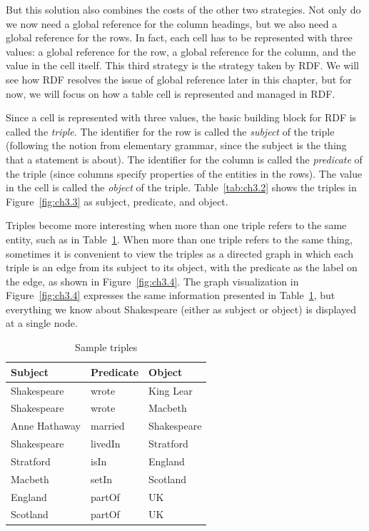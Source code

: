 But this solution also combines the costs of the other two strategies.
Not only do we now need a global reference for the column headings, but
we also need a global reference for the rows. In fact, each cell has to
be represented with three values: a global reference for the row, a
global reference for the column, and the value in the cell itself. This
third strategy is the strategy taken by RDF. We will see how RDF
resolves the issue of global reference later in this chapter, but for
now, we will focus on how a table cell is represented and managed in
RDF.

Since a cell is represented with three values, the basic building block
for RDF is called the \emph{triple}. The identifier for the row is called the
\emph{subject} of the triple (following the notion from elementary grammar,
since the subject is the thing that a statement is about). The
identifier for the column is called the \emph{predicate} of the triple (since
columns specify properties of the entities in the rows). The value in
the cell is called the \emph{object} of the triple. Table~\ref{tab:ch3.2} shows the triples
in Figure~\ref{fig:ch3.3} as subject, predicate, and object.

Triples become more interesting when more than one triple refers to the
same entity, such as in Table~\ref{tab:ch3.3}. When more than one triple refers to
the same thing, sometimes it is convenient to view the triples as a
directed graph in which each triple is an edge from its subject to its
object, with the predicate as the label on the edge, as shown in Figure~\ref{fig:ch3.4}. The graph visualization in Figure~\ref{fig:ch3.4} expresses the same
information presented in Table~\ref{tab:ch3.3}, but everything we know about
Shakespeare (either as subject or object) is displayed at a single node.

\begin{table}[h]
\centering
\begin{tabular}{||l l l||} 
 \hline
 Subject&Predicate&Object \\ [0.5ex] 
 \hline\hline
Shakespeare&wrote&King Lear \\
Shakespeare&wrote&Macbeth \\
Anne Hathaway&married&Shakespeare \\
Shakespeare&livedIn&Stratford \\
Stratford&isIn&England\\
Macbeth&setIn&Scotland\\
England&partOf&UK \\
Scotland&partOf&UK \\
\hline
\end{tabular}
\caption{Sample triples}
\label{tab:ch3.3}
\end{table}




